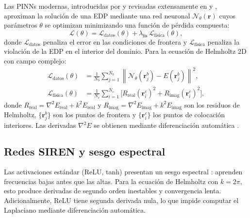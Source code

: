 Las PINNs modernas, introducidas por \textcite{raissi2019physics} y revisadas
extensamente en \textcite{karniadakis2021physics} y \textcite{cuomo2022scientific},
aproximan la solución de una EDP mediante una red neuronal
$\mathcal{N}_\theta(\mathbf{r})$ cuyos parámetros $\theta$ se optimizan
minimizando una función de pérdida compuesta:
%
\begin{equation}
    \mathcal{L}(\theta) = \mathcal{L}_\text{datos}(\theta)
    + \lambda_\text{fís}\,\mathcal{L}_\text{física}(\theta),
    \label{eq:loss_total}
\end{equation}
%
donde $\mathcal{L}_\text{datos}$ penaliza el error en las condiciones de
frontera y $\mathcal{L}_\text{física}$ penaliza la violación de la EDP en el
interior del dominio. Para la ecuación de Helmholtz 2D con campo complejo:
%
\begin{align}
    \mathcal{L}_\text{datos}(\theta) &=
    \frac{1}{N_b}\sum_{j=1}^{N_b}
    \left\|\mathcal{N}_\theta(\mathbf{r}_j^b) - E(\mathbf{r}_j^b)\right\|^2,
    \label{eq:loss_datos} \\[4pt]
    \mathcal{L}_\text{física}(\theta) &=
    \frac{1}{N_c}\sum_{i=1}^{N_c}
    \bigl[R_\text{real}(\mathbf{r}_i^c)^2 + R_\text{imag}(\mathbf{r}_i^c)^2\bigr],
    \label{eq:loss_fisica}
\end{align}
%
donde $R_\text{real} = \nabla^2 E_\text{real} + k^2 E_\text{real}$ y
$R_\text{imag} = \nabla^2 E_\text{imag} + k^2 E_\text{imag}$ son los residuos
de Helmholtz, $\{\mathbf{r}_j^b\}$ son los puntos de frontera y
$\{\mathbf{r}_i^c\}$ los puntos de colocación interiores. Las derivadas
$\nabla^2 E$ se obtienen mediante diferenciación automática
\parencite{baydin2018autodiff}.

\subsection{Redes SIREN y sesgo espectral}

Las activaciones estándar (ReLU, tanh) presentan un sesgo espectral
\parencite{rahaman2019spectral}: aprenden frecuencias bajas antes que las altas.
Para la ecuación de Helmholtz con $k = 2\pi$, esto produce derivadas de
segundo orden inestables y convergencia lenta. Adicionalmente, ReLU tiene
segunda derivada nula, lo que impide computar el Laplaciano mediante
diferenciación automática.

